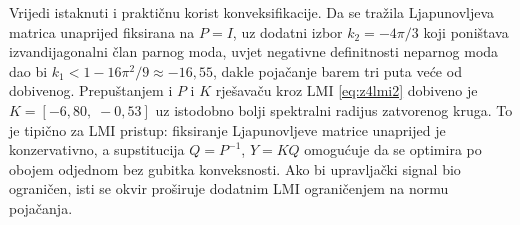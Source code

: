 Vrijedi istaknuti i praktičnu korist konveksifikacije. Da se tražila
Ljapunovljeva matrica unaprijed fiksirana na $P = I$, uz dodatni izbor
$k_2 = -4\pi/3$ koji poništava izvandijagonalni član parnog moda, uvjet
negativne definitnosti neparnog moda dao bi $k_1 < 1 - 16\pi^2/9 \approx -16{,}55$,
dakle pojačanje barem tri puta veće od dobivenog. Prepuštanjem i $P$ i $K$
rješavaču kroz LMI \eqref{eq:z4lmi2} dobiveno je $K = [-6{,}80,\; -0{,}53]$ uz
istodobno bolji spektralni radijus zatvorenog kruga. To je tipično za LMI
pristup: fiksiranje Ljapunovljeve matrice unaprijed je konzervativno, a
supstitucija $Q = P^{-1}$, $Y = KQ$ omogućuje da se optimira po obojem odjednom
bez gubitka konveksnosti. Ako bi upravljački signal bio ograničen, isti se okvir
proširuje dodatnim LMI ograničenjem na normu pojačanja.
